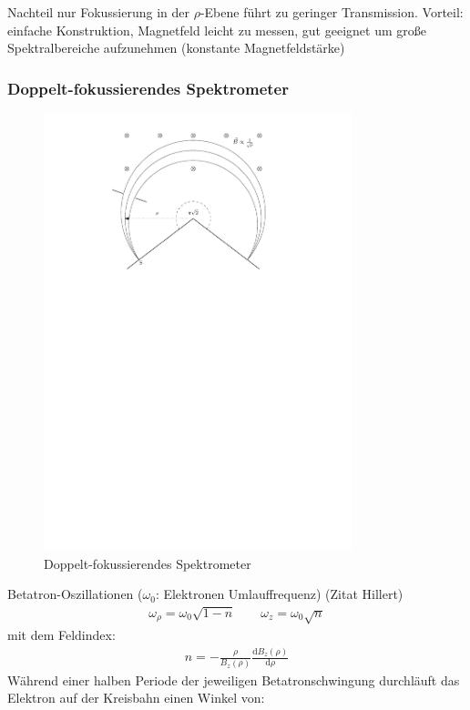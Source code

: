 \documentclass[11pt, a4paper]{article}
\numberwithin{equation}{section}
\begin{document}
Nachteil nur Fokussierung in der $\rho$-Ebene führt zu geringer Transmission.
Vorteil: einfache Konstruktion, Magnetfeld leicht zu messen, gut geeignet um große Spektralbereiche aufzunehmen (konstante Magnetfeldstärke)

\subsubsection{Doppelt-fokussierendes Spektrometer}
\begin{figure}[h]
	\centering
	\includegraphics[width=0.8\textwidth]{./figures/pisqrt2_spectrometer.pdf}
	\caption{Doppelt-fokussierendes Spektrometer}
	\label{fig:pisqrt2_spectro}
\end{figure}
Betatron-Oszillationen ($\omega_0$: Elektronen Umlauffrequenz) (Zitat Hillert)
\begin{align}
	\omega_\rho = \omega_0 \sqrt{1-n} \qquad \omega_z = \omega_0 \sqrt{n}
\end{align}
mit dem Feldindex:
\begin{align}
	n = - \frac{\rho}{B_z(\rho)} \frac{\mathrm{d} B_z(\rho)}{\mathrm{d} \rho}
\end{align}
Während einer halben Periode der jeweiligen Betatronschwingung durchläuft das Elektron auf der Kreisbahn einen Winkel von:
\end{document}
